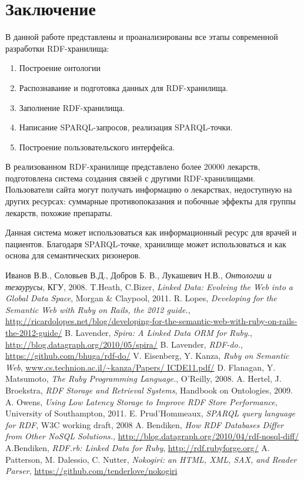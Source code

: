 \documentclass[specialist,subf,href,colorlinks=true
]{disser}
\begin{document}
\chapter*{Заключение}
В данной работе представлены и проанализированы все этапы современной разработки RDF-хранилища:
\begin{enumerate}
 \item Построение онтологии
 \item Распознавание и подготовка данных для RDF-хранилища.
 \item Заполнение RDF-хранилища.
 \item Написание SPARQL-запросов, реализация SPARQL-точки.
 \item Построение пользовательского интерфейса.
\end{enumerate}
В реализованном RDF-хранилище представлено более 20000 лекарств, подготовлена система создания связей с другими RDF-хранилищами. Пользователи сайта могут получать информацию о лекарствах, недоступную на других ресурсах: суммарные противопоказания и побочные эффекты для группы лекарств, похожие препараты.

Данная система может использоваться как информационный ресурс для врачей и пациентов. Благодаря SPARQL-точке, хранилище может использоваться и как основа для семантических ризонеров.

\begin{thebibliography}{9}
   Иванов В.В., Соловьев В.Д., Добров Б. В., Лукашевич Н.В., \emph{Онтологии и тезаурусы}, КГУ, 2008.
   T.Heath, C.Bizer, \emph{Linked Data: Evolving the Web into a Global Data Space}, Morgan \& Claypool, 2011.
   R. Lopes, \emph{Developing for the Semantic Web with Ruby on Rails, the 2012 guide.}, \url{http://ricardolopes.net/blog/developing-for-the-semantic-web-with-ruby-on-rails-the-2012-guide/}
   B. Lavender, \emph{Spira: A Linked Data ORM for Ruby.}, \url{http://blog.datagraph.org/2010/05/spira/}
   B. Lavender, \emph{RDF-do.}, \url{https://github.com/bhuga/rdf-do/}
   V. Eisenberg, Y. Kanza, \emph{Ruby on Semantic Web}, \url{www.cs.technion.ac.il/~kanza/Papers/ ICDE11.pdf/}
   D. Flanagan, Y. Matsumoto, \emph{The Ruby Programming Language.}, O’Reilly, 2008.
   A. Hertel, J. Broekstra, \emph{RDF Storage and Retrieval Systems},  Handbook on Ontologies, 2009.
   A. Owens, \emph{Using Low Latency Storage to Improve RDF Store Performance},  University of Southampton, 2011.
   E. Prud'Hommeaux, \emph{SPARQL query language for RDF},  W3C working draft, 2008
   A. Bendiken, \emph{How RDF Databases Differ from Other NoSQL Solutions.}, \url{http://blog.datagraph.org/2010/04/rdf-nosql-diff/}
   A.Bendiken, \emph{RDF.rb: Linked Data for Ruby}, \url{http://rdf.rubyforge.org/}
   A. Patterson, M. Dalessio, C. Nutter, \emph{Nokogiri: an HTML, XML, SAX, and Reader Parser}, \url{https://github.com/tenderlove/nokogiri}
\end{thebibliography}
\end{document}
